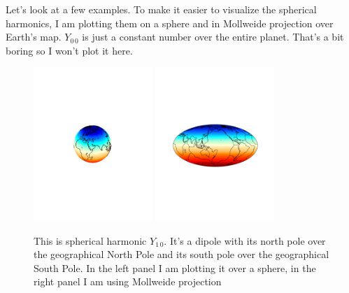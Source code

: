 \documentclass[11pt]{article}
\newcommand{\Yfun}{Y}
\begin{document}
Let's look at a few examples. To make it easier to visualize the
spherical harmonics, I am plotting them on a sphere and in Mollweide
projection over Earth's map. $\Yfun_{0\,0}$ is just a constant number
over the entire planet. That's a bit boring so I won't plot it here.

\begin{figure}%
\centering \includegraphics[width=0.4\textwidth,trim = 7cm 10cm 7cm
  10cm, clip]{figures/Y10} \includegraphics[width=0.4\textwidth,trim =
  3cm 9cm 3cm 10cm, clip]{figures/Y10_Mol}
\caption{This is spherical harmonic $\Yfun_{1\,0}$. It's a dipole with
  its north pole over the geographical North Pole and its south pole
  over the geographical South Pole. In the left panel I am plotting it
  over a sphere, in the right panel I am using Mollweide projection}
\label{Y10fig}
\end{figure}
\end{document}
